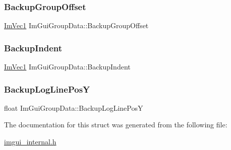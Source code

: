\subsubsection{\texorpdfstring{Backup\+Group\+Offset}{BackupGroupOffset}}
{\footnotesize\ttfamily \mbox{\hyperlink{struct_im_vec1}{Im\+Vec1}} Im\+Gui\+Group\+Data\+::\+Backup\+Group\+Offset}

\mbox{\label{struct_im_gui_group_data_a0eea82f9d3952d538431a23295e1beaa}} 
\subsubsection{\texorpdfstring{Backup\+Indent}{BackupIndent}}
{\footnotesize\ttfamily \mbox{\hyperlink{struct_im_vec1}{Im\+Vec1}} Im\+Gui\+Group\+Data\+::\+Backup\+Indent}

\mbox{\label{struct_im_gui_group_data_af67f52c70f74a3b7bce8ce46affc856b}} 
\subsubsection{\texorpdfstring{Backup\+Log\+Line\+PosY}{BackupLogLinePosY}}
{\footnotesize\ttfamily float Im\+Gui\+Group\+Data\+::\+Backup\+Log\+Line\+PosY}



The documentation for this struct was generated from the following file\+:\begin{DoxyCompactItemize}
\item 
\mbox{\hyperlink{imgui__internal_8h}{imgui\+\_\+internal.\+h}}\end{DoxyCompactItemize}
